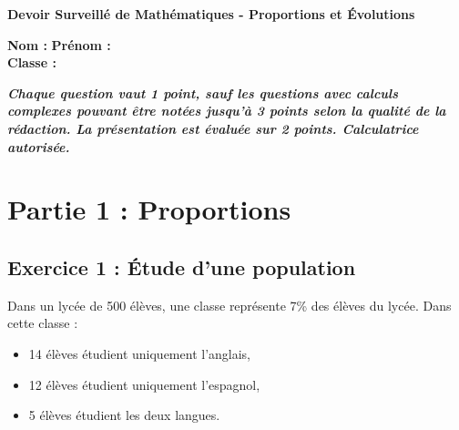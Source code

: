 \documentclass[12pt,a4paper]{article}
\begin{document}
\centering\textbf{Devoir Surveillé de Mathématiques - Proportions et Évolutions}\\
\vspace{0.5cm}

\noindent\textbf{Nom :} \underline{\hspace{5cm}} \hfill \textbf{Prénom :} \underline{\hspace{5cm}} \\
\textbf{Classe :} \underline{\hspace{5cm}}\\
\vspace{1cm}

\centering\textit{\textbf{Chaque question vaut 1 point, sauf les questions avec calculs complexes pouvant être notées jusqu’à 3 points selon la qualité de la rédaction. La présentation est évaluée sur 2 points. Calculatrice autorisée.}}

\section*{Partie 1 : Proportions}

\subsection*{Exercice 1 : Étude d’une population}
Dans un lycée de 500 élèves, une classe représente 7\% des élèves du lycée. Dans cette classe :
\begin{itemize}
    \item 14 élèves étudient uniquement l’anglais,
    \item 12 élèves étudient uniquement l’espagnol,
    \item 5 élèves étudient les deux langues.
\end{itemize}
\end{document}
